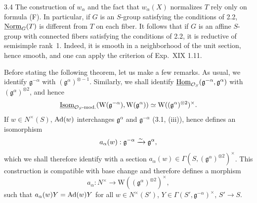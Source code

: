 \begin{remark}{3.4}\label{XX.3.4}
The construction of $w_\alpha$ and the fact that $w_\alpha(X)$ normalizes $T$ rely only on formula (F). In particular, if $G$ is an $S$-group satisfying the conditions of 2.2, $\underline{\mathrm{Norm}}_G(T)$ is different from $T$ on each fiber. It follows that if $G$ is an affine $S$-group with connected fibers satisfying the conditions of 2.2, it is reductive of semisimple rank~1. Indeed, it is smooth in a neighborhood of the unit section, hence smooth, and one can apply the criterion of Exp.~XIX 1.11.
\end{remark}

 Before stating the following theorem, let us make a few remarks. As usual, we identify $\mathfrak g^{-\alpha}$ with $(\mathfrak g^\alpha)^{\otimes-1}$. Similarly, we shall identify $\underline{\operatorname{Hom}}_{\mathcal{O}_S}(\mathfrak g^{-\alpha},\mathfrak g^\alpha)$ with $(\mathfrak g^\alpha)^{\otimes2}$, and hence
\[
\underline{\operatorname{Isom}}_{\mathcal{O}_S\text{-mod.}}(\mathrm W(\mathfrak g^{-\alpha}),\mathrm W(\mathfrak g^\alpha))\simeq\mathrm W((\mathfrak g^\alpha)^{\otimes2})^\times.
\]
If $w\in N^\times(S)$, $\operatorname{Ad}(w)$ interchanges $\mathfrak g^\alpha$ and $\mathfrak g^{-\alpha}$ (3.1, (iii)), hence defines an isomorphism
\[
a_\alpha(w):\mathfrak g^{-\alpha}\xrightarrow{\sim}\mathfrak g^\alpha,
\]
which we shall therefore identify with a section $a_\alpha(w)\in\Gamma(S,(\mathfrak g^\alpha)^{\otimes2})^\times$. This construction is compatible with base change and therefore defines a morphism
\[
a_\alpha:N^\times\to\mathrm W((\mathfrak g^\alpha)^{\otimes2})^\times,
\]
such that $a_\alpha(w)Y=\operatorname{Ad}(w)Y$ for all $w\in N^\times(S')$, $Y\in\Gamma(S',\mathfrak g^{-\alpha})^\times$, $S'\to S$.

